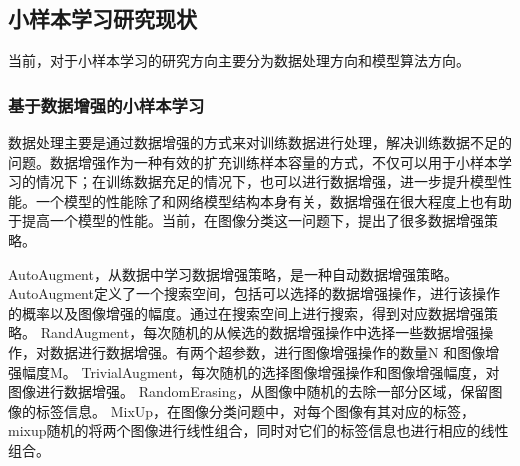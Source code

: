\documentclass[AutoFakeBold]{LZUThesis}
\begin{document}
\subsection{小样本学习研究现状}
当前，对于小样本学习的研究方向主要分为数据处理方向和模型算法方向。
\subsubsection{基于数据增强的小样本学习}
数据处理主要是通过数据增强的方式来对训练数据进行处理，解决训练数据不足的问题。数据增强作为一种有效的扩充训练样本容量的方式，不仅可以用于小样本学习的情况下；在训练数据充足的情况下，也可以进行数据增强，进一步提升模型性能。一个模型的性能除了和网络模型结构本身有关，数据增强在很大程度上也有助于提高一个模型的性能。当前，在图像分类这一问题下，提出了很多数据增强策略\textsuperscript{\cite{shorten2019survey, yang2022image}}。

AutoAugment\textsuperscript{\cite{cubuk2019autoaugment}}，从数据中学习数据增强策略，是一种自动数据增强策略。AutoAugment定义了一个搜索空间，包括可以选择的数据增强操作，进行该操作的概率以及图像增强的幅度。通过在搜索空间上进行搜索，得到对应数据增强策略。
RandAugment\textsuperscript{\cite{cubuk2020randaugment}}，每次随机的从候选的数据增强操作中选择一些数据增强操作，对数据进行数据增强。有两个超参数，进行图像增强操作的数量N
和图像增强幅度M。
TrivialAugment\textsuperscript{\cite{muller2021trivialaugment}}，每次随机的选择图像增强操作和图像增强幅度，对图像进行数据增强。
RandomErasing\textsuperscript{\cite{zhong2020random}}，从图像中随机的去除一部分区域，保留图像的标签信息。
MixUp\textsuperscript{\cite{zhang2017mixup}}，在图像分类问题中，对每个图像有其对应的标签，mixup随机的将两个图像进行线性组合，同时对它们的标签信息也进行相应的线性组合。
\end{document}
